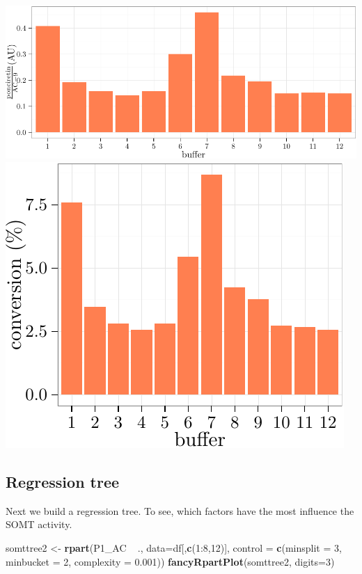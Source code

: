 \documentclass[]{article}
\newenvironment{Shaded}{\begin{snugshade}}{\end{snugshade}}
\newcommand{\KeywordTok}[1]{\textcolor[rgb]{0.13,0.29,0.53}{\textbf{{#1}}}}
\newcommand{\DataTypeTok}[1]{\textcolor[rgb]{0.13,0.29,0.53}{{#1}}}
\newcommand{\DecValTok}[1]{\textcolor[rgb]{0.00,0.00,0.81}{{#1}}}
\newcommand{\FloatTok}[1]{\textcolor[rgb]{0.00,0.00,0.81}{{#1}}}
\newcommand{\StringTok}[1]{\textcolor[rgb]{0.31,0.60,0.02}{{#1}}}
\newcommand{\NormalTok}[1]{{#1}}
\begin{document}
\includegraphics{analysis_files/figure-latex/unnamed-chunk-7-1.pdf}
\includegraphics{analysis_files/figure-latex/unnamed-chunk-7-2.pdf}

\subsection{Regression tree}\label{regression-tree-1}

Next we build a regression tree. To see, which factors have the most
influence the SOMT activity.

\begin{Shaded}
\begin{Highlighting}[]
\NormalTok{somttree2 <-}\StringTok{ }\KeywordTok{rpart}\NormalTok{(P1_AC ~}\StringTok{ }\NormalTok{., }
                \DataTypeTok{data=}\NormalTok{df[,}\KeywordTok{c}\NormalTok{(}\DecValTok{1}\NormalTok{:}\DecValTok{8}\NormalTok{,}\DecValTok{12}\NormalTok{)],}
                \DataTypeTok{control =} \KeywordTok{c}\NormalTok{(}\DataTypeTok{minsplit =} \DecValTok{3}\NormalTok{,}
                            \DataTypeTok{minbucket =} \DecValTok{2}\NormalTok{,}
                            \DataTypeTok{complexity =} \FloatTok{0.001}\NormalTok{))}
\KeywordTok{fancyRpartPlot}\NormalTok{(somttree2, }\DataTypeTok{digits=}\DecValTok{3}\NormalTok{)}
\end{Highlighting}
\end{Shaded}
\end{document}
